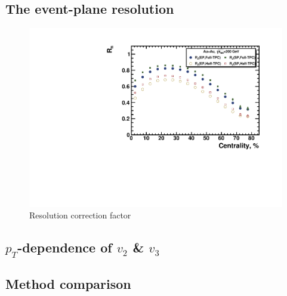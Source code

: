 \FloatBarrier
\subsection{The event-plane resolution}

\begin{figure}
    \centering
    \includegraphics[width=0.7\linewidth]{Figures/ResSPFullHalfvn.pdf}
    \caption{Resolution correction factor}
    \label{fig:res_SP}
\end{figure}

\FloatBarrier
\subsection{$p_{T}$-dependence of $v_2$ \& $v_3$}

\FloatBarrier
\subsection{Method comparison}